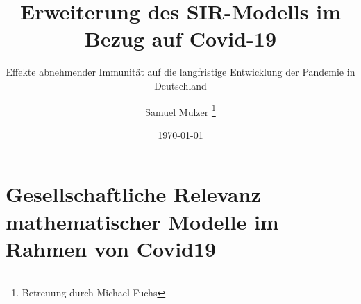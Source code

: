 \documentclass[12pt,a4paper,titlepage]{scrartcl}
\title{Erweiterung des SIR-Modells im Bezug auf Covid-19}
\subtitle{Effekte abnehmender Immunität auf die langfristige Entwicklung der Pandemie in Deutschland}
\author{Samuel Mulzer \thanks{Betreuung durch Michael Fuchs}}
\date{\today{}}
\begin{document}
  \maketitle
  \tableofcontents

  \section*{Gesellschaftliche Relevanz mathematischer Modelle im Rahmen von Covid19}
    \label{sec:introduction}
    
\end{document}
